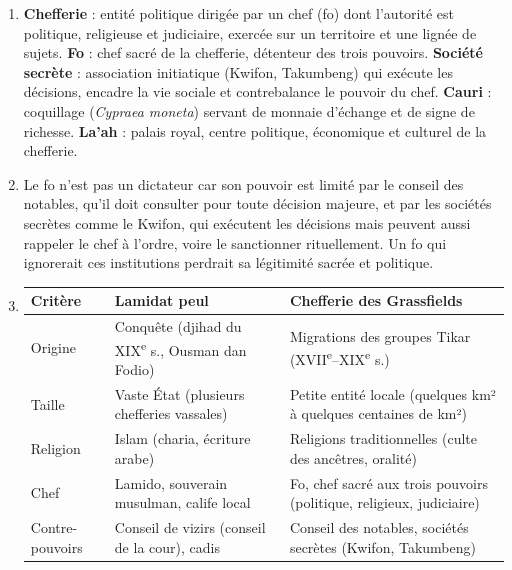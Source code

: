 \documentclass[11pt]{article}
\begin{document}
\begin{corrige}[Exercice]
\begin{enumerate}
\item \textbf{Chefferie} : entité politique dirigée par un chef (fo) dont l'autorité est politique, religieuse et judiciaire, exercée sur un territoire et une lignée de sujets. \textbf{Fo} : chef sacré de la chefferie, détenteur des trois pouvoirs. \textbf{Société secrète} : association initiatique (Kwifon, Takumbeng) qui exécute les décisions, encadre la vie sociale et contrebalance le pouvoir du chef. \textbf{Cauri} : coquillage (\emph{Cypraea moneta}) servant de monnaie d'échange et de signe de richesse. \textbf{La'ah} : palais royal, centre politique, économique et culturel de la chefferie.
\item Le fo n'est pas un dictateur car son pouvoir est limité par le conseil des notables, qu'il doit consulter pour toute décision majeure, et par les sociétés secrètes comme le Kwifon, qui exécutent les décisions mais peuvent aussi rappeler le chef à l'ordre, voire le sanctionner rituellement. Un fo qui ignorerait ces institutions perdrait sa légitimité sacrée et politique.
\item 
\begin{center}
\begin{tabularx}{\linewidth}{|l|X|X|}
\hline
\rowcolor{popblueL} \textbf{Critère} & \textbf{Lamidat peul} & \textbf{Chefferie des Grassfields} \\
\hline
Origine & Conquête (djihad du XIX\textsuperscript{e} s., Ousman dan Fodio) & Migrations des groupes Tikar (XVII\textsuperscript{e}--XIX\textsuperscript{e} s.) \\
\hline
Taille & Vaste État (plusieurs chefferies vassales) & Petite entité locale (quelques km² à quelques centaines de km²) \\
\hline
Religion & Islam (charia, écriture arabe) & Religions traditionnelles (culte des ancêtres, oralité) \\
\hline
Chef & Lamido, souverain musulman, calife local & Fo, chef sacré aux trois pouvoirs (politique, religieux, judiciaire) \\
\hline
Contre-pouvoirs & Conseil de vizirs (conseil de la cour), cadis & Conseil des notables, sociétés secrètes (Kwifon, Takumbeng) \\
\hline
\end{tabularx}
\end{center}
\end{enumerate}
\end{corrige}
\end{document}
